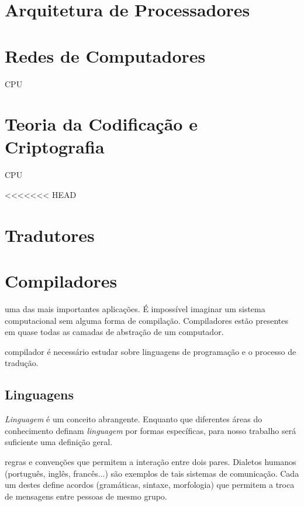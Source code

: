 \section{Arquitetura de Processadores}

\section{Redes de Computadores}

CPU

\section{Teoria da Codificação e Criptografia}

CPU

<<<<<<< HEAD
\section{Tradutores}

\section{Compiladores}

uma das mais importantes aplicações.  É impossível imaginar um sistema
computacional sem alguma forma de compilação. Compiladores estão presentes em
quase todas as camadas de abstração de um computador.

compilador é necessário estudar sobre linguagens de programação e o processo de
tradução.

\subsection{Linguagens}

\textit{Linguagem} é um conceito abrangente. Enquanto que diferentes áreas do
conhecimento definam \textit{linguagem} por formas específicas, para nosso
trabalho será suficiente uma definição geral.

regras e convenções que permitem a interação entre dois pares. Dialetos humanos
(português, inglês, francês...) são exemplos de tais sistemas de
comunicação. Cada um destes define acordos (gramáticas, sintaxe, morfologia) que
permitem a troca de mensagens entre pessoas de mesmo grupo.


